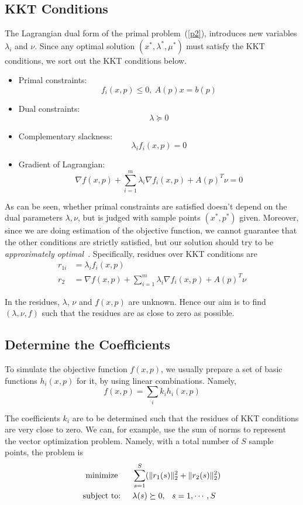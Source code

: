 \subsection{KKT Conditions}

The Lagrangian dual form of the primal problem~(\ref{p2}), introduces new variables $\lambda_i$ and $\nu$. Since any optimal solution $(x^*,\lambda^*,\mu^*)$ must satisfy the KKT conditions, we sort out the KKT conditions below.

\begin{itemize}
\item Primal constraints: \[f_i(x,p)\le0,\ A(p)x=b(p)\]
\item Dual constraints: \[\lambda\succeq0\]
\item Complementary slackness: \[\lambda_if_i(x,p)=0\]
\item Gradient of Lagrangian: \[\nabla f(x,p)+\sum_{i=1}^m\lambda_i\nabla f_i(x,p)+A(p)^T\nu=0\]
\end{itemize}

As can be seen, whether primal constraints are satisfied doesn't depend on the dual parameters $\lambda,\nu$, but is judged with sample points $(x^*,p^*)$ given. Moreover, since we are doing estimation of the objective function, we cannot guarantee that the other conditions are strictly satisfied, but our solution should try to be \textit{approximately optimal}~\cite{keshavarz2011}. Specifically, residues over KKT conditions are
\begin{align}
r_{1i}&=\lambda_if_i(x,p)\\
r_2&=\nabla f(x,p)+\sum_{i=1}^m\lambda_i\nabla f_i(x,p)+A(p)^T\nu
\end{align}

In the residues, $\lambda$, $\nu$ and $f(x,p)$ are unknown. Hence our aim is to find $(\lambda,\nu,f)$ such that the residues are as close to zero as possible.

\subsection{Determine the Coefficients}

To simulate the objective function $f(x,p)$, we usually prepare a set of basic functions $h_i(x,p)$ for it, by using linear combinations. Namely,
\[f(x,p)=\sum_ik_ih_i(x,p)\]

The coefficients $k_i$ are to be determined such that the residues of KKT conditions are very close to zero. We can, for example, use the sum of norms to represent the vector optimization problem. Namely, with a total number of $S$ sample points, the problem is
\begin{align}
\begin{split}\label{p3}
\textrm{minimize }\hspace{.2in}&\sum_{s=1}^S(\|r_1(s)\|_2^2+\|r_2(s)\|_2^2)\\
\textrm{subject to:}\hspace{.2in}&\lambda(s)\succeq0,\hspace{.1in}s=1,\cdots,S
\end{split}
\end{align}

~
